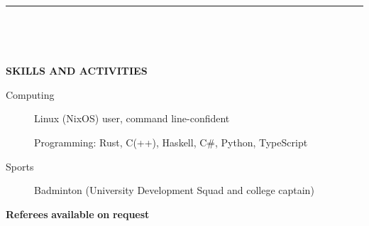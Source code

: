 \documentclass[
  11pt,
  a4paper,
]{article}
\newcommand{\itemspace}{0.8ex}
\newcommand{\ruledheader}[2]{%
\begingroup
\setlength{\fboxsep}{0pt}%
\colorbox{#1}{%
\parbox[b][1.2ex][t]{35mm}{\begin{tiny}\ \end{tiny}}}%
\parbox[b][1.2ex][t]{5mm}{\begin{tiny}\ \end{tiny}}%
\uppercase{\textbf{#2}}
\endgroup}
\begin{document}
\begin{Large}

\vspace{-1.5ex}\rule{\textwidth}{0.8pt}\vspace{2ex}

\ruledheader{cyan!50!teal}{Skills and activities}\end{Large}

\vspace{\itemspace}

\begin{description}
\item[Computing]
Linux (NixOS) user, command line-confident

Programming: Rust, C(++), Haskell, C\#, Python, TypeScript
\item[Sports]
Badminton (University Development Squad and college captain)
\end{description}

\vspace{2.0ex}\begin{center}

\textbf{Referees} \textbf{available} \textbf{on} \textbf{request}

\end{center}
\end{document}
